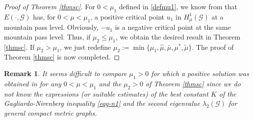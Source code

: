 \documentclass[10pt,a4paper]{article}
\newtheorem{remark}[theorem]{Remark}
\theoremstyle{definition} \theoremstyle{remark}
\numberwithin{equation}{section}
\newcommand{\G}{\mathcal{G}}
\newcommand{\B}{\mathcal{B}}
\newcommand{\la}{\lambda}
\begin{document}
\begin{proof} [Proof of Theorem \ref{thmsc}]
\medskip
For $0 < \mu_1$ defined in \eqref{defmu1}, we know from \cite[Theorem 1.1]{CJS} that $E(\cdot,\G)$ has, for $0 < \mu < \mu_1$, a positive critical point $u_1$ in $H^1_\mu(\G)$ at a mountain pass level. Obviously, $-u_1$ is a negative critical point at the same mountain pass level. Thus, if  $\mu_2 \leq \mu_1$, we obtain the desired result in Theorem \ref{thmsc}. If $\mu_2 > \mu_1$, we just redefine $\mu_2 := \min\{\mu_1,\hat{\mu}, \bar{\mu}, \mu^*, \tilde{\mu}\}$. The proof of Theorem \ref{thmsc} is now completed.
\end{proof}


\begin{remark}
It seems difficult to compare $\mu_1 >0$ for which a positive solution was obtained in \cite{CJS} for any $0 < \mu < \mu_1$ and the
 $\mu_2 >0$ of Theorem \ref{thmsc} since we do not know the expressions (or suitable estimates) of the best constant $K$ of the Gagliardo-Nirenberg inequality \eqref{eqg-n1} and the second eigenvalue $\la_2(\G)$ for general compact metric graphs. 
\end{remark}





\end{document}
